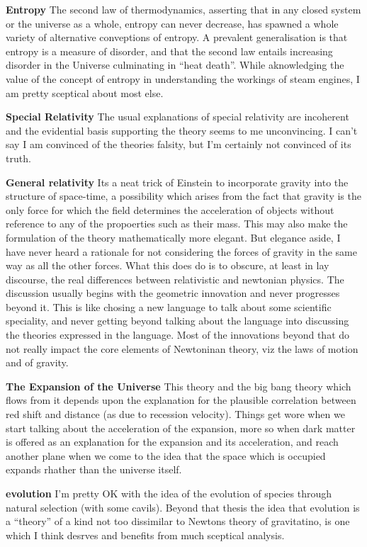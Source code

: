\documentclass[10pt,titlepage]{book}
\begin{document}
\begin{description}
\item{\bf Entropy}
  The second law of thermodynamics, asserting that in any closed system or the universe as a whole, entropy can never decrease, has spawned a whole variety of alternative conveptions of entropy.
  A prevalent generalisation is that entropy is a measure of disorder, and that the second law entails increasing disorder in the Universe culminating in ``heat death''.
  While aknowledging the value of the concept of entropy in understanding the workings of steam engines, I am pretty sceptical about most else.
\item{\bf Special Relativity}
  The usual explanations of special relativity are incoherent and the evidential basis supporting the theory seems to me unconvincing.
  I can't say I am convinced of the theories falsity, but I'm certainly not convinced of its truth.
\item{\bf General relativity}
  Its a neat trick of Einstein to incorporate gravity into the structure of space-time,  a possibility which arises from the fact that gravity is the only force for which the field determines the acceleration of objects without reference to any of the propoerties such as their mass.
  This may also make the formulation of the theory mathematically more elegant.
  But elegance aside, I have never heard a rationale for not considering the forces of gravity in the same way as all the other forces.
  What this does do is to obscure, at least in lay discourse, the real differences between relativistic and newtonian physics.
  The discussion usually begins with the geometric innovation and never progresses beyond it.
  This is like chosing a new language to talk about some scientific speciality, and never getting beyond talking about the language into discussing the theories expressed in the language.
  Most of the innovations beyond that do not really impact the core elements of Newtoninan theory, viz the laws of motion and of gravity.
  \item{\bf The Expansion of the Universe}
    This theory and the big bang theory which flows from it depends upon the explanation for the plausible correlation between red shift and distance (as due to recession velocity).
    Things get wore when we start talking about the acceleration of the expansion, more so when dark matter is offered as an explanation for the expansion and its acceleration, and reach another plane when we come to the idea that the space which is occupied expands rhather than the universe itself.
  \item{\bf evolution}
    I'm pretty OK with the idea of the evolution of species through natural selection (with some cavils).
    Beyond that thesis the idea that evolution is a ``theory'' of a kind not too dissimilar to Newtons theory of gravitatino, is one which I think desrves and benefits from much sceptical analysis.
    \end{description}
\end{document}
